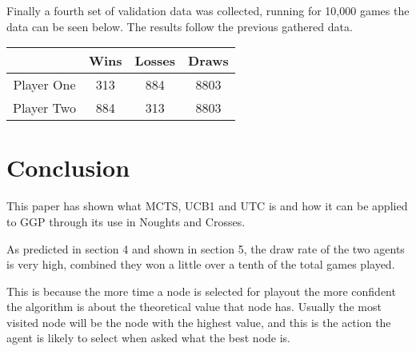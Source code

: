 \documentclass[conference]{IEEEtran}
\begin{document}
Finally a fourth set of validation data was collected, running for 10,000 games the data can be seen below. The results follow the previous gathered data. 
\begin{center}
	\begin{tabular}{||c c c c||}
		\hline
		{} & Wins & Losses & Draws \\ [0.5ex] 
		\hline\hline
		Player One & 313 & 884 & 8803\\
		\hline
		Player Two & 884 & 313 & 8803\\
	\end{tabular}
\end{center}

\section{Conclusion}
This paper has shown what MCTS, UCB1 and UTC is and how it can be applied to GGP through its use in Noughts and Crosses.

As predicted in section 4 and shown in section 5, the draw rate of the two agents is very high, combined they won a little over a tenth of the total games played.

This is because the more time a node is selected for playout the more confident the algorithm is about the theoretical value that node has. Usually the most visited node will be the node with the highest value, and this is the action the agent is likely to select when asked what the best node is.   
\end{document}
